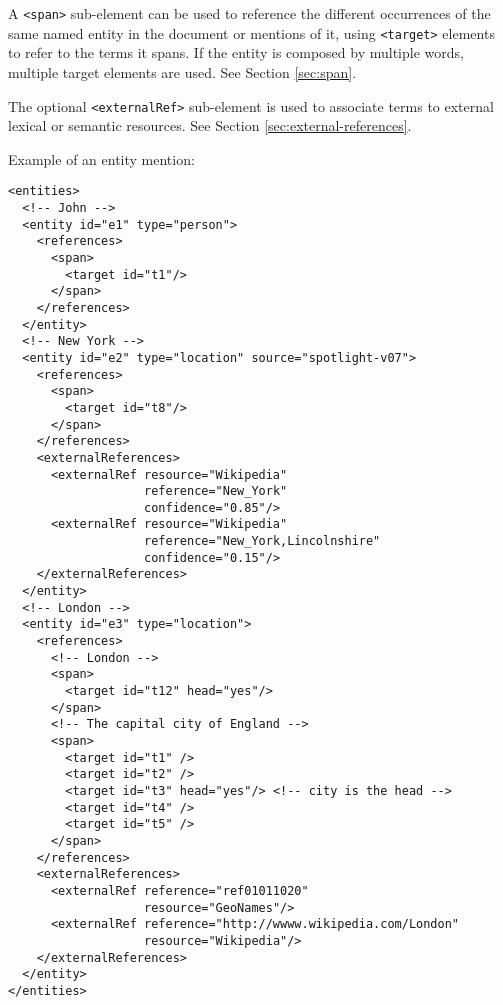 A \texttt{<span>} sub-element can be used to reference the different
occurrences of the same named entity in the document or mentions of it,
using \texttt{<target>} elements to refer to the terms it spans. If the
entity is composed by multiple words, multiple target elements are used. See
Section \ref{sec:span}.

The optional \texttt{<externalRef>} sub-element is used to associate terms
to external lexical or semantic resources. See Section
\ref{sec:external-references}.

Example of an entity mention:

\begin{Verbatim}[fontsize=\small]
<entities>
  <!-- John -->
  <entity id="e1" type="person">
    <references>
      <span>
        <target id="t1"/>
      </span>
    </references>
  </entity>
  <!-- New York -->
  <entity id="e2" type="location" source="spotlight-v07">
    <references>
      <span>
        <target id="t8"/>
      </span>
    </references>
    <externalReferences>
      <externalRef resource="Wikipedia"
                   reference="New_York"
                   confidence="0.85"/>
      <externalRef resource="Wikipedia"
                   reference="New_York,Lincolnshire"
                   confidence="0.15"/>
    </externalReferences>
  </entity>
  <!-- London -->
  <entity id="e3" type="location">
    <references>
      <!-- London -->
      <span>
        <target id="t12" head="yes"/>
      </span>
      <!-- The capital city of England -->
      <span>
        <target id="t1" />
        <target id="t2" />
        <target id="t3" head="yes"/> <!-- city is the head -->
        <target id="t4" />
        <target id="t5" />
      </span>
    </references>
    <externalReferences>
      <externalRef reference="ref01011020" 
                   resource="GeoNames"/>
      <externalRef reference="http://wwww.wikipedia.com/London" 
                   resource="Wikipedia"/>
    </externalReferences>
  </entity>
</entities>
\end{Verbatim}


